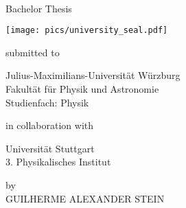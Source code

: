 

\begin{titlepage}

\vspace{1.3cm}
 \\

\vspace{1.7cm}\huge {Bachelor Thesis}\vspace{0.5cm}

\begin{minipage}{0.2\textwidth}
	\texttt{[image: pics/university\_seal.pdf]}
\end{minipage}

\vspace{0.5cm}
\normalsize{submitted to} \\
\vspace{0.5cm}

\Large{Julius-Maximilians-Universität Würzburg \\
Fakultät für Physik und Astronomie\\
Studienfach: Physik }\\ \vspace{0.5cm}

\normalsize{in collaboration with} \\
\vspace{0.5cm}

\Large{Universität Stuttgart \\
3. Physikalisches Institut }\\ \vspace{1cm}

\normalsize{by }\\
\vspace{0.5cm}
{\large GUILHERME ALEXANDER STEIN}\\ \vspace{0.5cm}


\end{titlepage}
